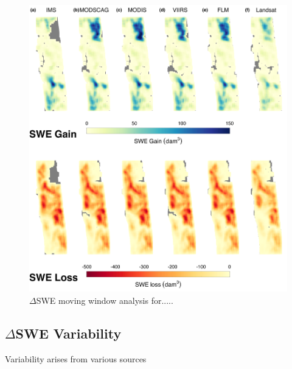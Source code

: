 \clearpage
\begin{figure}[h]
\centering
\label{fig:dswe_moving_window}
\includegraphics[width=\textwidth]{figures/ch4_figs/dswe_mw_full_dam3_v1.png}
\caption{$\Delta$SWE moving window analysis for.....}
\end{figure}


\hypertarget{ch4-results}{\subsection{$\Delta$SWE Variability}\label{ch4-results}}

Variability arises from various sources

